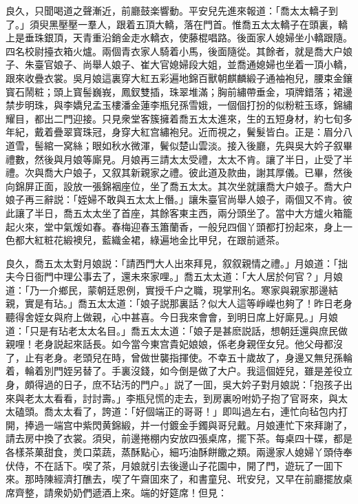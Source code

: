 良久，只聞喝道之聲漸近，前廳鼓楽響動。平安兒先進來報道：「喬太太轎子到了。」須臾黑壓壓一羣人，跟着五頂大轎，落在門首。惟喬五太太轎子在頭裏，轎上是垂珠銀頂，天青重沿銷金走水轎衣，使藤棍唱路。後面家人媳婦坐小轎跟隨。四名校尉擡衣箱火爐。兩個青衣家人騎着小馬，後面隨從。其餘者，就是喬大户娘子、朱臺官娘子、尚舉人娘子、崔大官媳婦段大姐，並喬通媳婦也坐着一頂小轎，跟來收疊衣裳。吳月娘這裏穿大紅五彩遍地錦百獸朝麒麟緞子通袖袍兒，腰束金鑲寳石鬧粧；頭上寳髻巍峩，鳳釵雙插，珠翠堆滿；胸前繡帶垂金，項牌錯落；裙邊禁步明珠，與李嬌兒孟玉樓潘金蓮李瓶兒孫雪娥，一個個打扮的似粉粧玉琢，錦繡耀目，都出二門迎接。只見衆堂客簇擁着喬五太太進來，生的五短身材，約七旬多年紀，戴着疊翠寳珠冠，身穿大紅宫繡袍兒。近而視之，鬢髮皆白。正是：眉分八道雪，髻綰一窝絲；眼如秋水微渾，鬢似楚山雲淡。接入後廳，先與吳大妗子叙畢禮數，然後與月娘等廝見。月娘再三請太太受禮，太太不肯。讓了半日，止受了半禮。次與喬大户娘子，又叙其新親家之禮。彼此道及款曲，謝其厚儀。已畢，然後向錦屏正面，設放一張錦裀座位，坐了喬五太太。其次坐就讓喬大户娘子。喬大户娘子再三辭説：「姪婦不敢與五太太上僭。」讓朱臺官尚舉人娘子，兩個又不肯。彼此讓了半日，喬五太太坐了首座，其餘客東主西，兩分頭坐了。當中大方爐火箱籠起火來，堂中氣煖如春。春梅迎春玉簫蘭香，一般兒四個丫頭都打扮起來，身上一色都大紅粧花緞襖兒，藍織金裙，綠遍地金比甲兒，在跟前遞茶。

良久，喬五太太對月娘説：「請西門大人出來拜見，叙叙親情之禮。」月娘道：「拙夫今日衙門中理公事去了，還未來家哩。」喬五太太道：「大人居於何官？」月娘道：「乃一介鄉民，蒙朝廷恩例，實授千户之職，現掌刑名。寒家與親家那邊結親，實是有玷。」喬五太太道：「娘子説那裏話？似大人這等崢嶸也夠了！昨日老身聽得舍姪女與府上做親，心中甚喜。今日我來會會，到明日席上好廝見。」月娘道：「只是有玷老太太名目。」喬五太太道：「娘子是甚麽説話，想朝廷還與庶民做親哩！老身説起來話長。如今當今東宫貴妃娘娘，係老身親侄女兒。他父母都沒了，止有老身。老頭兒在時，曾做世襲指揮使。不幸五十歲故了，身邊又無兒孫輪着，輪着別門姪另替了。手裏沒錢，如今倒是做了大户。我這個姪兒，雖是差役立身，頗得過的日子，庶不玷汚的門户。」説了一囬，吳大妗子對月娘説：「抱孩子出來與老太太看看，討討壽。」李瓶兒慌的走去，到房裏吩咐奶子抱了官哥來，與太太磕頭。喬太太看了，誇道：「好個端正的哥哥！」即叫過左右，連忙向毡包内打開，捧過一端宫中紫閃黄錦緞，并一付鍍金手鐲與哥兒戴。月娘連忙下來拜謝了，請去房中換了衣裳。須臾，前邊捲棚内安放四張桌席，擺下茶。每桌四十碟，都是各樣茶菓甜食，羙口菜蔬，蒸酥點心，細巧油酥餅饊之類。兩邊家人媳婦丫頭侍奉伏侍，不在話下。喫了茶，月娘就引去後邊山子花園中，開了門，遊玩了一囬下來。那時陳經濟打醮去，喫了午齋囬來了，和書童兒、玳安兒，又早在前廳擺放桌席齊整，請衆奶奶們遞酒上來。端的好筵席！但見：

